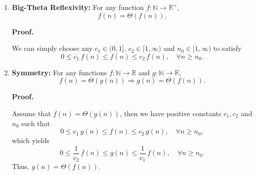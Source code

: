\documentclass[12pt]{article}
\begin{document}
\begin{enumerate}
    \item \textbf{Big-Theta Reflexivity:} For any function \(f : \mathbb{N} \to \mathbb{R}^+\),
    \[
        f(n) = \Theta(f(n)).
    \]

    \textbf{Proof.}
    
    We can simply choose any \(c_1 \in (0, 1]\), \(c_2 \in [1, \infty)\) and \(n_0 \in [1, \infty)\) to satisfy
    \[
        0 \leq c_1 \, f(n) \leq f(n) \leq c_2 \, f(n), \quad \forall n \geq n_0.
    \]

    \item \textbf{Symmetry:} For any functions \(f : \mathbb{N} \to \mathbb{R}\) and \(g : \mathbb{N} \to \mathbb{R}\),
    \[
        f(n) = \Theta(g(n)) \Longrightarrow g(n) = \Theta(f(n)).
    \]

    \textbf{Proof.}

    Assume that \(f(n) = \Theta(g(n))\), then we have positive constants \(c_1, c_2\) and \(n_0\) such that
    \[
        0 \leq c_1 \, g(n) \leq f(n) \leq c_2 \, g(n), \quad \forall n \geq n_0,
    \]
    which yields
    \[
        0 \leq \frac{1}{c_2} \, f(n) \leq g(n) \leq \frac{1}{c_1} \, f(n), \quad \forall n \geq n_0.
    \]
    Thus, \(g(n) = \Theta(f(n))\).
\end{enumerate}
\end{document}
